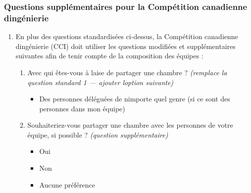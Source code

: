 \subsubsection{Questions supplémentaires pour la Compétition canadienne d\textquotesingle ingénierie}
\label{questions-cci-chambres}

\begin{enumerate}
 \item
  En plus des questions standardisées ci-dessus, la Compétition canadienne d\textquotesingle ingénierie (CCI) doit utiliser les questions modifiées et supplémentaires suivantes afin de tenir compte de la composition des équipes :

  \begin{enumerate}
   \item
    Avec qui êtes-vous à l\textquotesingle aise de partager une chambre ? \emph{(remplace la question standard 1 — ajouter l\textquotesingle option suivante)}
    \begin{itemize}
     \item Des personnes déléguées de n\textquotesingle importe quel genre (si ce sont des personnes dans mon équipe)
    \end{itemize}

   \item
    Souhaiteriez-vous partager une chambre avec les personnes de votre équipe, si possible ? \emph{(question supplémentaire)}
    \begin{itemize}
     \item Oui
     \item Non
     \item Aucune préférence
    \end{itemize}

  \end{enumerate}
\end{enumerate}

